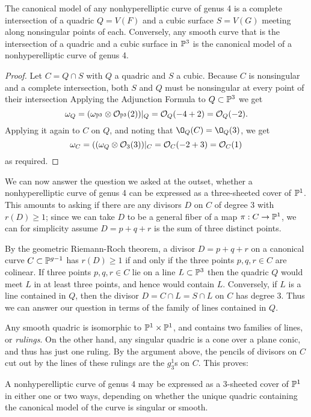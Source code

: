 \begin{theorem}
The canonical model of any nonhyperelliptic curve of genus 4 is a complete intersection of a quadric $Q = V(F)$ and a cubic surface $S = V(G)$ meeting along nonsingular points of each. Conversely, any smooth curve that is the intersection of a quadric and a cubic surface in $\PP^3$ is the canonical model of a nonhyperelliptic curve of genus 4.
\end{theorem}
 
\begin{proof}
Let $C = Q\cap S$ with $Q$ a quadric and $S$ a cubic. Because $C$ is nonsingular and a complete intersection, both $S$ and $Q$ must be nonsingular at every point of their intersection Applying the Adjunction Formula to $Q\subset \PP^3$ we get
$$
\omega_Q = (\omega_{\PP^3} \otimes \cO_{\PP^3}(2))|_Q = \cO_Q(-4+2) = \cO_Q(-2).
$$
Applying it again to $C$ on $Q$, and noting that $\O_Q(C) = \O_Q(3)$, we get
$$
\omega_C = ((\omega_{Q} \otimes \cO_{3}(3))|_C = \cO_C(-2+3) = \cO_C(1)
$$
as required. 
\end{proof}

We can now answer the question we asked at the outset, whether a nonhyperelliptic curve of genus 4 can be expressed as a three-sheeted cover of $\PP^1$. This amounts to asking if there are any divisors $D$ on $C$ of degree 3 with $r(D) \geq 1$; since we can take $D$ to be a general fiber of a map $\pi : C \to \PP^1$, we can for simplicity assume $D = p+q+r$ is the sum of three distinct points.

By the geometric Riemann-Roch theorem, a divisor $D = p+q+r$ on a canonical curve $C \subset \PP^{g-1}$ has $r(D) \geq 1$ if and only if the three points $p,q,r \in C$ are colinear. If three points $p,q,r \in C$ lie on a line $L \subset \PP^3$ then the quadric $Q$ would meet $L$ in at least three points, and hence would contain $L$. Conversely,  if $L$ is a line contained in $Q$, then the divisor $D = C \cap L = S \cap L$ on $C$ has degree  3. Thus we can answer our question in terms of the family of lines contained in $Q$.

Any smooth quadric is isomorphic to $\PP^1\times \PP^1$, and contains two families of lines, or \emph{rulings}. On the other hand, any singular quadric is a cone over a plane conic, and thus has just one ruling. By the argument above, the pencils of divisors on $C$ cut out by the lines of these rulings are the $g^1_3$s on $C$. This proves:

\begin{proposition}\label{genus 4 trigonal}
A nonhyperelliptic curve of genus 4 may be expressed as a 3-sheeted cover of $\PP^1$ in either one or two ways, depending on whether the unique quadric containing the canonical model of the curve is singular or smooth.
\end{proposition}

